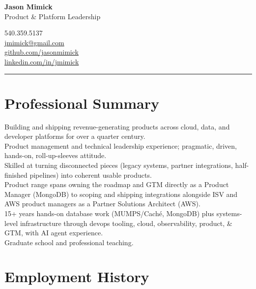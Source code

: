 \documentclass[10pt,letterpaper]{article}
\begin{document}
\noindent
\begin{minipage}[t]{0.62\textwidth}
{\fontsize{22}{26}\selectfont\bfseries\color{accent} Jason Mimick}\\[2pt]
{\normalsize\color{lighttext} Product \& Platform Leadership}
\end{minipage}%
\hfill
\begin{minipage}[t]{0.36\textwidth}
\raggedleft
{\small\color{lighttext}
540.359.5137\\
\href{mailto:jmimick@gmail.com}{jmimick@gmail.com}\\
\href{https://github.com/jasonmimick}{github.com/jasonmimick}\\
\href{https://www.linkedin.com/in/jmimick}{linkedin.com/in/jmimick}}
\end{minipage}

\vspace{2pt}
{\color{ruleline}\hrule}

\vspace{2pt}

\section{Professional Summary}
{\small
Building and shipping revenue-generating products across cloud, data, and developer platforms for over a quarter century.\\
Product management and technical leadership experience; pragmatic, driven, hands-on, roll-up-sleeves attitude.\\
Skilled at turning disconnected pieces (legacy systems, partner integrations, half-finished pipelines) into coherent usable products.\\
Product range spans owning the roadmap and GTM directly as a Product Manager (MongoDB) to scoping and shipping integrations alongside ISV and AWS product managers as a Partner Solutions Architect (AWS).\\
15+ years hands-on database work (MUMPS/Cach\'e, MongoDB) plus systems-level infrastructure through devops tooling, cloud, observability, product, \& GTM, with AI agent experience.\\
Graduate school and professional teaching.}

\section{Employment History}
\end{document}
